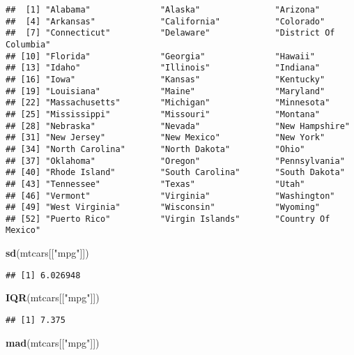 \documentclass[]{article}
\newenvironment{Shaded}{\begin{snugshade}}{\end{snugshade}}
\newcommand{\KeywordTok}[1]{\textcolor[rgb]{0.13,0.29,0.53}{\textbf{#1}}}
\newcommand{\StringTok}[1]{\textcolor[rgb]{0.31,0.60,0.02}{#1}}
\newcommand{\NormalTok}[1]{#1}
\begin{document}
\begin{verbatim}
##  [1] "Alabama"              "Alaska"               "Arizona"             
##  [4] "Arkansas"             "California"           "Colorado"            
##  [7] "Connecticut"          "Delaware"             "District Of Columbia"
## [10] "Florida"              "Georgia"              "Hawaii"              
## [13] "Idaho"                "Illinois"             "Indiana"             
## [16] "Iowa"                 "Kansas"               "Kentucky"            
## [19] "Louisiana"            "Maine"                "Maryland"            
## [22] "Massachusetts"        "Michigan"             "Minnesota"           
## [25] "Mississippi"          "Missouri"             "Montana"             
## [28] "Nebraska"             "Nevada"               "New Hampshire"       
## [31] "New Jersey"           "New Mexico"           "New York"            
## [34] "North Carolina"       "North Dakota"         "Ohio"                
## [37] "Oklahoma"             "Oregon"               "Pennsylvania"        
## [40] "Rhode Island"         "South Carolina"       "South Dakota"        
## [43] "Tennessee"            "Texas"                "Utah"                
## [46] "Vermont"              "Virginia"             "Washington"          
## [49] "West Virginia"        "Wisconsin"            "Wyoming"             
## [52] "Puerto Rico"          "Virgin Islands"       "Country Of Mexico"
\end{verbatim}

\begin{Shaded}
\begin{Highlighting}[]
\KeywordTok{sd}\NormalTok{(mtcars[[}\StringTok{"mpg"}\NormalTok{]])}
\end{Highlighting}
\end{Shaded}

\begin{verbatim}
## [1] 6.026948
\end{verbatim}

\begin{Shaded}
\begin{Highlighting}[]
\KeywordTok{IQR}\NormalTok{(mtcars[[}\StringTok{"mpg"}\NormalTok{]])}
\end{Highlighting}
\end{Shaded}

\begin{verbatim}
## [1] 7.375
\end{verbatim}

\begin{Shaded}
\begin{Highlighting}[]
\KeywordTok{mad}\NormalTok{(mtcars[[}\StringTok{"mpg"}\NormalTok{]])}
\end{Highlighting}
\end{Shaded}
\end{document}
